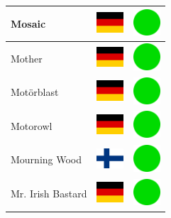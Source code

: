 \documentclass[12pt, a4paper, twoside]{report}
\begin{document}
\begin{center}
\begin{longtable}{|p{5cm}|p{2cm}|p{2cm}|}
 Mosaic                                                     & \includegraphics[width=1cm]{../img/flags/de} &   \includegraphics[width=1cm]{../likes/y} \\ \hline
 Mother                                                     & \includegraphics[width=1cm]{../img/flags/de} &   \includegraphics[width=1cm]{../likes/y} \\ \hline
 Motörblast                                                 & \includegraphics[width=1cm]{../img/flags/de} &   \includegraphics[width=1cm]{../likes/y} \\ \hline
 Motorowl                                                   & \includegraphics[width=1cm]{../img/flags/de} &   \includegraphics[width=1cm]{../likes/y} \\ \hline
 Mourning Wood                                              & \includegraphics[width=1cm]{../img/flags/fi} &   \includegraphics[width=1cm]{../likes/y} \\ \hline
 Mr. Irish Bastard                                          & \includegraphics[width=1cm]{../img/flags/de} &   \includegraphics[width=1cm]{../likes/y} \\ \hline

\end{longtable}
\end{center}
\end{document}
